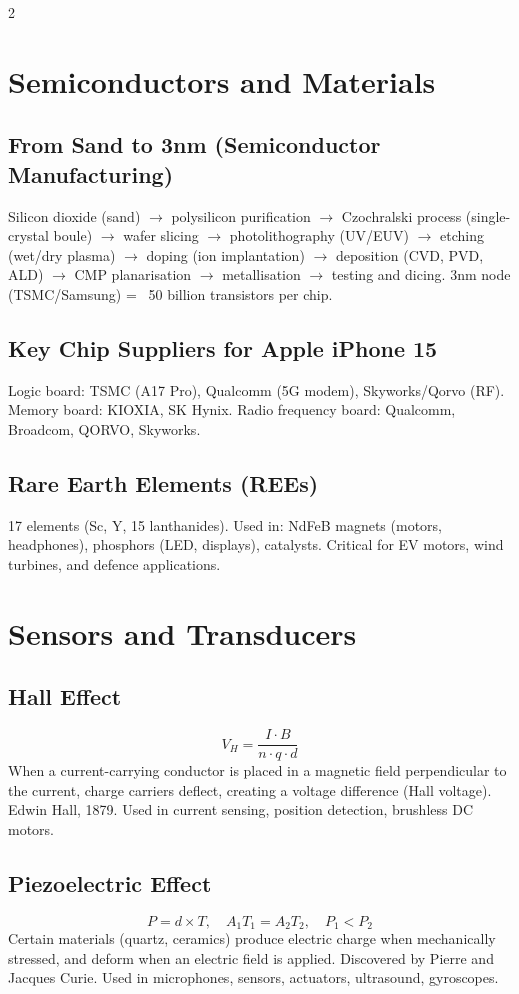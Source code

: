 \documentclass[10pt,a4paper]{article}
\begin{document}
\begin{multicols}{2}
\section{Semiconductors and Materials}

\subsection{From Sand to 3nm (Semiconductor Manufacturing)}
Silicon dioxide (sand) $\to$ polysilicon purification $\to$ Czochralski process (single-crystal boule) $\to$ wafer slicing $\to$ photolithography (UV/EUV) $\to$ etching (wet/dry plasma) $\to$ doping (ion implantation) $\to$ deposition (CVD, PVD, ALD) $\to$ CMP planarisation $\to$ metallisation $\to$ testing and dicing. 3nm node (TSMC/Samsung) = ~50 billion transistors per chip.

\subsection{Key Chip Suppliers for Apple iPhone 15}
Logic board: TSMC (A17 Pro), Qualcomm (5G modem), Skyworks/Qorvo (RF). Memory board: KIOXIA, SK Hynix. Radio frequency board: Qualcomm, Broadcom, QORVO, Skyworks.

\subsection{Rare Earth Elements (REEs)}
17 elements (Sc, Y, 15 lanthanides). Used in: NdFeB magnets (motors, headphones), phosphors (LED, displays), catalysts. Critical for EV motors, wind turbines, and defence applications.

\section{Sensors and Transducers}

\subsection{Hall Effect}
\[
V_H = \frac{I \cdot B}{n \cdot q \cdot d}
\]
When a current-carrying conductor is placed in a magnetic field perpendicular to the current, charge carriers deflect, creating a voltage difference (Hall voltage). Edwin Hall, 1879. Used in current sensing, position detection, brushless DC motors.

\subsection{Piezoelectric Effect}
\[
P = d \times T, \quad A_1 T_1 = A_2 T_2, \quad P_1 < P_2
\]
Certain materials (quartz, ceramics) produce electric charge when mechanically stressed, and deform when an electric field is applied. Discovered by Pierre and Jacques Curie. Used in microphones, sensors, actuators, ultrasound, gyroscopes.


\end{multicols}
\end{document}
